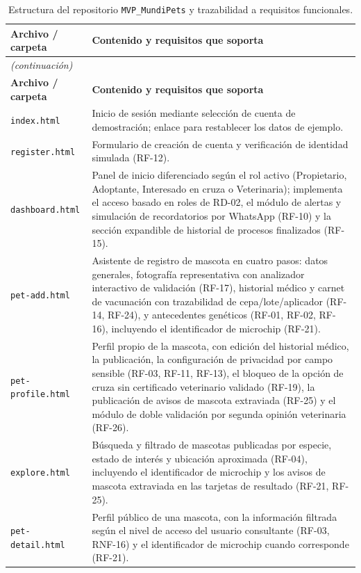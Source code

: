 \documentclass[journal,onecolumn]{IEEEtran}
\begin{document}
	\begin{longtable}{@{}p{4.2cm} p{10.6cm}@{}}
		\caption{Estructura del repositorio \texttt{MVP\_MundiPets} y trazabilidad a requisitos funcionales.}
		\label{tab:estructura-mvp} \\
		\hline
		\textbf{Archivo / carpeta} & \textbf{Contenido y requisitos que soporta} \\
		\hline
		\endfirsthead
		\multicolumn{2}{|l|}{\textit{(continuación)}} \\
		\hline
		\textbf{Archivo / carpeta} & \textbf{Contenido y requisitos que soporta} \\
		\hline
		\endhead
		\hline
		\endfoot
		\texttt{index.html} & Inicio de sesión mediante selección de cuenta de demostración; enlace para restablecer los datos de ejemplo. \\
		\hline
		\texttt{register.html} & Formulario de creación de cuenta y verificación de identidad simulada (RF-12). \\
		\hline
		\texttt{dashboard.html} & Panel de inicio diferenciado según el rol activo (Propietario, Adoptante, Interesado en cruza o Veterinaria); implementa el acceso basado en roles de RD-02, el módulo de alertas y simulación de recordatorios por WhatsApp (RF-10) y la sección expandible de historial de procesos finalizados (RF-15). \\
		\hline
		\texttt{pet-add.html} & Asistente de registro de mascota en cuatro pasos: datos generales, fotografía representativa con analizador interactivo de validación (RF-17), historial médico y carnet de vacunación con trazabilidad de cepa/lote/aplicador (RF-14, RF-24), y antecedentes genéticos (RF-01, RF-02, RF-16), incluyendo el identificador de microchip (RF-21). \\
		\hline
		\texttt{pet-profile.html} & Perfil propio de la mascota, con edición del historial médico, la publicación, la configuración de privacidad por campo sensible (RF-03, RF-11, RF-13), el bloqueo de la opción de cruza sin certificado veterinario validado (RF-19), la publicación de avisos de mascota extraviada (RF-25) y el módulo de doble validación por segunda opinión veterinaria (RF-26). \\
		\hline
		\texttt{explore.html} & Búsqueda y filtrado de mascotas publicadas por especie, estado de interés y ubicación aproximada (RF-04), incluyendo el identificador de microchip y los avisos de mascota extraviada en las tarjetas de resultado (RF-21, RF-25). \\
		\hline
		\texttt{pet-detail.html} & Perfil público de una mascota, con la información filtrada según el nivel de acceso del usuario consultante (RF-03, RNF-16) y el identificador de microchip cuando corresponde (RF-21). \\

\end{longtable}
\end{document}

